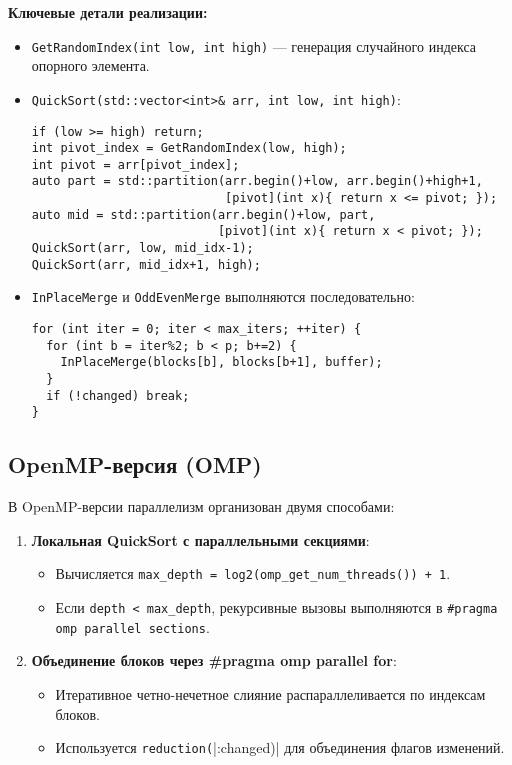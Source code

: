 \documentclass[12pt]{article}
\begin{document}
\noindent\textbf{Ключевые детали реализации:}
\begin{itemize}
    \item \texttt{GetRandomIndex(int low, int high)} — генерация случайного индекса опорного элемента.
    \item \texttt{QuickSort(std::vector<int>\& arr, int low, int high)}:
    \begin{lstlisting}
if (low >= high) return;
int pivot_index = GetRandomIndex(low, high);
int pivot = arr[pivot_index];
auto part = std::partition(arr.begin()+low, arr.begin()+high+1,
                           [pivot](int x){ return x <= pivot; });
auto mid = std::partition(arr.begin()+low, part,
                          [pivot](int x){ return x < pivot; });
QuickSort(arr, low, mid_idx-1);
QuickSort(arr, mid_idx+1, high);
    \end{lstlisting}
    \item \texttt{InPlaceMerge} и \texttt{OddEvenMerge} выполняются последовательно:
    \begin{lstlisting}
for (int iter = 0; iter < max_iters; ++iter) {
  for (int b = iter%2; b < p; b+=2) {
    InPlaceMerge(blocks[b], blocks[b+1], buffer);
  }
  if (!changed) break;
}
    \end{lstlisting}
\end{itemize}

\subsection{OpenMP-версия (OMP)}
\hspace*{1.25em}В OpenMP-версии параллелизм организован двумя способами:
\begin{enumerate}
    \item \textbf{Локальная QuickSort с параллельными секциями}:
    \begin{itemize}
        \item Вычисляется \verb|max_depth = log2(omp_get_num_threads()) + 1|.
        \item Если \verb|depth < max_depth|, рекурсивные вызовы выполняются в \verb|#pragma omp parallel sections|.
    \end{itemize}
    \item \textbf{Объединение блоков через #pragma omp parallel for}:
    \begin{itemize}
        \item Итеративное четно-нечетное слияние распараллеливается по индексам блоков.
        \item Используется \verb|reduction(||:changed)| для объединения флагов изменений.
    \end{itemize}
\end{enumerate}
\end{document}
